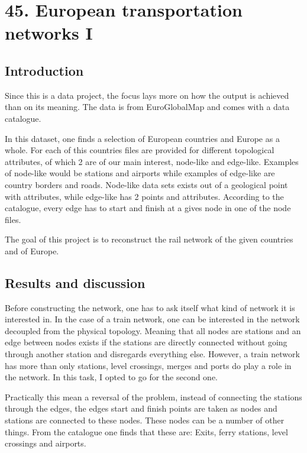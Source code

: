 \chapter{45. European transportation networks I}




\section{Introduction}

 Since this is a data project, the focus lays more on how the output is achieved than on its meaning.
 The data is from EuroGlobalMap and comes with a data catalogue.

 In this dataset, one finds a selection of European countries and Europe as a whole. For each of this countries files are provided for different topological attributes, of which 2 are of our main interest, node-like and edge-like.
 Examples of node-like would be stations and airports while examples of edge-like are country borders and roads. Node-like data sets exists out of a geological point with attributes, while edge-like has 2 points and attributes. According to the catalogue, every edge has to start and finish at a gives node in one of the node files. 
 
 The goal of this project is to reconstruct the rail network of the given countries and of Europe.

\section{Results and discussion}

Before constructing the network, one has to ask itself what kind of network it is interested in. In the case of a train network, one can be interested in the network decoupled from the physical topology. Meaning that all nodes are stations and an edge between nodes exists if the stations are directly connected without going through another station and disregards everything else. However, a train network has more than only stations, level crossings, merges and ports do play a role in the network. 
In this task, I opted to go for the second one.

Practically this mean a reversal of the problem, instead of connecting the stations through the edges,  the edges start and finish points are taken as nodes and stations are connected to these nodes.
These nodes can be a number of other things. From the catalogue one finds that these are: Exits, ferry stations, level crossings and airports.

